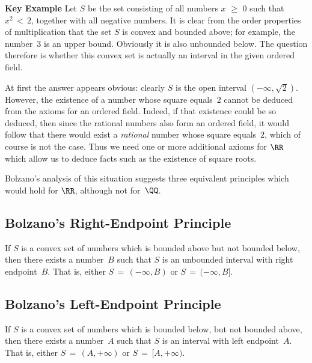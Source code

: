 \V

        {\bf Key Example} Let $S$ be the set consisting of all numbers $x\,\,{\geq}\,\,0$ such that $x^{2}\,<\,2$, together with all negative numbers.
    It is clear from the order properties of multiplication that the set $S$ is convex and bounded above; for example, the number~$3$ is an upper bound.
    Obviously it is also unbounded below. The question therefore is whether this convex set is actually an interval in the given ordered field.

        At first the answer appears obvious: clearly $S$ is the open interval $(-{\infty},\sqrt{2})$.
    However, the existence of a number whose square equals~$2$ cannot be deduced from the axioms for an ordered field.
    Indeed, if that existence could be so deduced, then since the rational numbers also form an ordered field,
    it would follow that there would exist a {\em rational} number whose square equals~$2$, which of course is not the case.
    Thus we need one or more additional axioms for ${\RR}$ which allow us to deduce facts such as the existence of square roots.

\V


        Bolzano's analysis of this situation suggests three equivalent principles which would hold for ${\RR}$, although not for~${\QQ}$.

\V

            \subsection{\small{\bf Bolzano's Right-Endpoint Principle}}
            \label{DefB30.07B}

\V

        If $S$ is a convex set of numbers which is bounded above but not bounded below,
    then there exists a number~$B$ such that $S$ is an unbounded interval with right endpoint~$B$.
    That is, either $S \,=\, (-{\infty},B)$ or $S \,=\, (-{\infty},B]$.

\VV
            \subsection{\small{\bf Bolzano's Left-Endpoint Principle}}
            \label{DefB30.07C}

\V

        If $S$ is a convex set of numbers which is bounded below, but not bounded above,
    then there exists a number~$A$ such that $S$ is an interval with left endpoint~$A$.
    That is, either $S \,=\, (A,+{\infty})$ or $S \,=\, [A,+{\infty})$.

